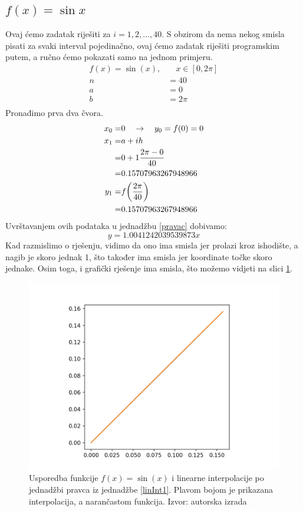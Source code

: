 \documentclass[12pt,a4paper]{report}
\begin{document}
		
		\subsection{$f(x)=\sin x$}
		Ovaj ćemo zadatak riješiti za $i=1, 2,\ldots, 40$. S obzirom da nema nekog smisla pisati za svaki interval pojedinačno, ovaj ćemo zadatak riješiti programskim putem, a ručno ćemo pokazati samo na jednom primjeru.
		\begin{align*}
			f(x)=\sin (x),& \quad x\in [0, 2\pi]\\
			n&=40\\
			a&=0\\
			b&=2\pi\\
		\end{align*}
		Pronađimo prva dva čvora.
		\begin{align*}
			x_0=&0\quad\rightarrow \quad y_0=f(0)=0\\
			x_1=&a+ih\\=&0+1\frac{2\pi-0}{40}\\
				=&0.15707963267948966\\
			y_1=&f\biggr{(}\frac{2\pi}{40}\biggr{)}\\=&0.15707963267948966
		\end{align*}
		Uvrštavanjem ovih podataka u jednadžbu \ref{pravac} dobivamo:
		\begin{equation}
			y=1.0041242039539873x
			\label{linInt1}
		\end{equation}
		Kad razmislimo o rješenju, vidimo da ono ima smisla jer prolazi kroz ishodište, a nagib je skoro jednak 1, što također ima smisla jer koordinate točke skoro jednake. Osim toga, i grafički rješenje ima smisla, što možemo vidjeti na slici \ref{linInterSlika1}.
		\begin{figure}[h]
			\includegraphics[width=\textwidth]{slike/usporedba40.png}
			\caption{Usporedba funkcije $f(x)=\sin (x)$ i linearne interpolacije po jednadžbi pravca iz jednadžbe \ref{linInt1}. Plavom bojom je prikazana interpolacija, a narančastom funkcija. Izvor: autorska izrada}
			\label{linInterSlika1}
		\end{figure}
\end{document}
